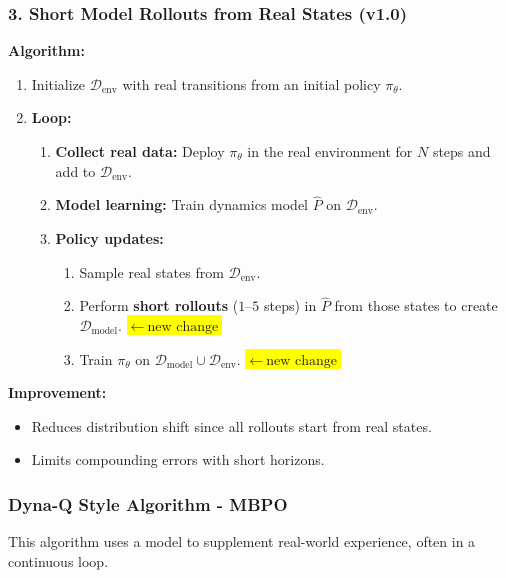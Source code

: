 \documentclass[12pt]{article}
\begin{document}
\subsubsection*{3. Short Model Rollouts from Real States (v1.0)}
\textbf{Algorithm:}
\begin{enumerate}
    \item Initialize $\mathcal{D}_{\text{env}}$ with real transitions from an initial policy $\pi_\theta$.
    \item \textbf{Loop:}
    \begin{enumerate}
        \item \textbf{Collect real data:} Deploy $\pi_\theta$ in the real environment for $N$ steps and add to $\mathcal{D}_{\text{env}}$.
        \item \textbf{Model learning:} Train dynamics model $\hat{P}$ on $\mathcal{D}_{\text{env}}$.
        \item \textbf{Policy updates:}
        \begin{enumerate}
            \item Sample real states from $\mathcal{D}_{\text{env}}$.
            \item Perform \textbf{short rollouts} ($1$--$5$ steps) in $\hat{P}$ from those states to create $\mathcal{D}_{\text{model}}$. \colorbox{yellow}{\(\leftarrow\ \text{new change}\)}
            \item Train $\pi_\theta$ on $\mathcal{D}_{\text{model}} \cup \mathcal{D}_{\text{env}}$. \colorbox{yellow}{\(\leftarrow\ \text{new change}\)}
        \end{enumerate}
    \end{enumerate}
\end{enumerate}


\textbf{Improvement:}
\begin{itemize}
    \item Reduces distribution shift since all rollouts start from real states.
    \item Limits compounding errors with short horizons.
\end{itemize}

\subsubsection{Dyna-Q Style Algorithm - MBPO}
This algorithm uses a model to supplement real-world experience, often in a continuous loop.
\end{document}
